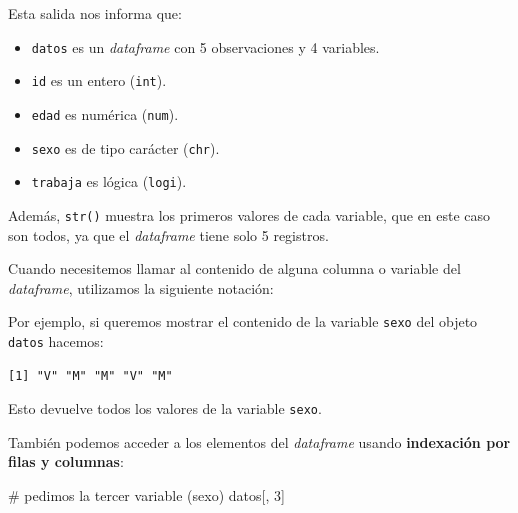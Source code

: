 \documentclass[
  spanish,
  letterpaper,
  DIV=11,
  numbers=noendperiod]{scrreprt}
\newenvironment{Shaded}{\begin{snugshade}}{\end{snugshade}}
\newcommand{\CommentTok}[1]{\textcolor[rgb]{0.37,0.37,0.37}{#1}}
\newcommand{\DecValTok}[1]{\textcolor[rgb]{0.68,0.00,0.00}{#1}}
\newcommand{\NormalTok}[1]{\textcolor[rgb]{0.00,0.23,0.31}{#1}}
\newcommand{\SpecialCharTok}[1]{\textcolor[rgb]{0.37,0.37,0.37}{#1}}
\begin{document}
Esta salida nos informa que:

\begin{itemize}
\item
  \texttt{datos} es un \emph{dataframe} con 5 observaciones y 4
  variables.
\item
  \texttt{id} es un entero (\texttt{int}).
\item
  \texttt{edad} es numérica (\texttt{num}).
\item
  \texttt{sexo} es de tipo carácter (\texttt{chr}).
\item
  \texttt{trabaja} es lógica (\texttt{logi}).
\end{itemize}

Además, \texttt{str()} muestra los primeros valores de cada variable,
que en este caso son todos, ya que el \emph{dataframe} tiene solo 5
registros.

Cuando necesitemos llamar al contenido de alguna columna o variable del
\emph{dataframe}, utilizamos la siguiente notación:

\begin{Shaded}
\end{Shaded}

Por ejemplo, si queremos mostrar el contenido de la variable
\texttt{sexo} del objeto \texttt{datos} hacemos:

\begin{Shaded}
\end{Shaded}

\begin{verbatim}
[1] "V" "M" "M" "V" "M"
\end{verbatim}

Esto devuelve todos los valores de la variable \texttt{sexo}.

También podemos acceder a los elementos del \emph{dataframe} usando
\textbf{indexación por filas y columnas}:

\begin{Shaded}
\begin{Highlighting}[]
\CommentTok{\# pedimos la tercer variable (sexo)}
\NormalTok{datos[, }\DecValTok{3}\NormalTok{]}
\end{Highlighting}
\end{Shaded}
\end{document}
